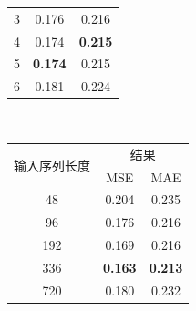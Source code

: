 \documentclass[twoside,12pt]{article}
\begin{document}
\begin{table}[htbp]
\begin{tabular}{c|cc}
    3                            & 0.176                                        & 0.216          \\
    4                            & 0.174                                        & \textbf{0.215} \\
    5                            & \textbf{0.174}                               & 0.215          \\
    6                            & 0.181                                        & 0.224          \\
    \bottomrule
  \end{tabular}
  \\
  \vspace{5pt}
  \centering
  \begin{tabular}{c|cc}
    \toprule
    \multirow{2}{*}{输入序列长度} & \multicolumn{2}{c}{结果}                  \\
    \cmidrule(lr){2-3}
                                  & MSE                      & MAE            \\
    \midrule
    48                            & 0.204                    & 0.235          \\
    96                            & 0.176                    & 0.216          \\
    192                           & 0.169                    & 0.216          \\
    336                           & \textbf{0.163}           & \textbf{0.213} \\
    720                           & 0.180                    & 0.232          \\
    \bottomrule
  \end{tabular}
\end{table}
\end{document}
